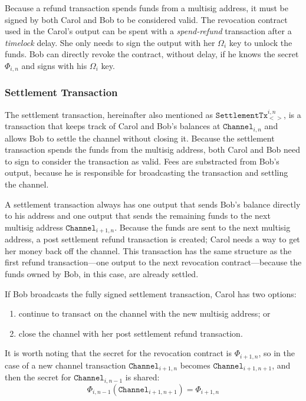 \documentclass{llncs}
\begin{document}
Because a refund transaction spends funds from a multisig address, it must be
signed by both Carol and Bob to be considered valid. The revocation contract
used in the Carol's output can be spent with a \textit{spend-refund} transaction
after a \textit{timelock} delay. She only needs to sign the output with her
$\Omega_{i}$ key to unlock the funds. Bob can directly revoke the contract,
without delay, if he knows the secret $\Phi_{i,n}$ and signs with his
$\Omega_{i}$ key.


\subsubsection{Settlement Transaction} The settlement transaction, hereinafter
also mentioned as $\texttt{SettlementTx}_{<>}^{i,n}$, is a transaction that
keeps track of Carol and Bob's balances at $\texttt{Channel}_{i,n}$ and allows
Bob to settle the channel without closing it. Because the settlement transaction
spends the funds from the multisig address, both Carol and Bob need to sign to
consider the transaction as valid. Fees are substracted from Bob's output,
because he is responsible for broadcasting the transaction and settling the
channel.

A settlement transaction always has one output that sends Bob's balance directly
to his address and one output that sends the remaining funds to the next
multisig address $\texttt{Channel}_{i+1,n}$. Because the funds are sent to the
next multisig address, a post settlement refund transaction is created; Carol
needs a way to get her money back off the channel. This transaction has the same
structure as the first refund transaction---one output to the next revocation
contract---because the funds owned by Bob, in this case, are already settled.

If Bob broadcasts the fully signed settlement transaction, Carol has two
options:
\begin{enumerate}[label=(\roman*)]
\item continue to transact on the channel with the new multisig address; or
\item close the channel with her post settlement refund transaction.
\end{enumerate} It is worth noting that the secret for the revocation contract
is $\Phi_{i+1,n}$, so in the case of a new channel transaction
$\texttt{Channel}_{i+1,n}$ becomes $\texttt{Channel}_{i+1,n+1}$, and then the
secret for $\texttt{Channel}_{i,n-1}$ is shared:
\[ \Phi_{i,n-1}(\texttt{Channel}_{i+1,n+1}) = \Phi_{i+1,n}
\]
\end{document}

